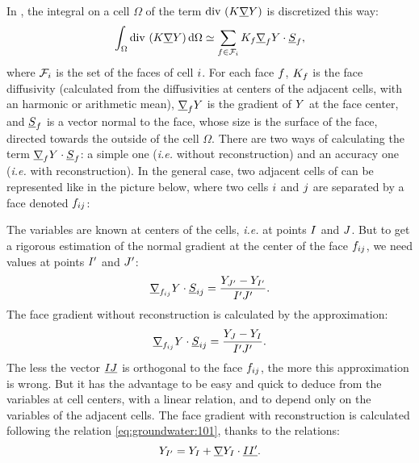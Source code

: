 In \CS, the integral on a cell $\Omega$ of the term $\dive \left( K \grad \varia \right)$ is discretized this way:
\begin{equation}
 \label{eq:groundwater:discrete_diffusive}
\int_{\Omega} \dive \left( K \grad \varia \right) \dd \Omega \simeq \sum_{\face \in \Face{\celli}} K_\face \grad_\face \varia \cdot \vect{S}_\face,
\end{equation}
where $\Face{\celli}$ is the set of the faces of cell $\celli$. For each face $\face$,
$K_\face$ is the face diffusivity (calculated from the diffusivities at centers of
the adjacent cells, with an harmonic or arithmetic mean),
$\grad_\face \varia$ is the gradient of $\varia$ at the face center,
and $\vect{S}_\face$ is a vector normal to the face, whose size is the surface of the face, directed towards the outside of the cell $\Omega$.
There are two ways of calculating the term $\grad_\face Y \cdot \vect{S}_\face$: a simple one (\emph{i.e.} without reconstruction)
and an accuracy one (\emph{i.e.} with reconstruction). In the general case, two adjacent cells of \CS can be represented like in the picture below,
where two cells $\celli$ and $\cellj$ are separated by a face denoted $\fij$:
\begin{figure}[!h]
\end{figure}
The variables are known at centers of the cells, \emph{i.e.} at points $\centi$ and $\centj$. But to get a rigorous estimation of the normal gradient at
the center of the face $\fij$, we need values at points $\centip$ and $\centjp$:
\begin{equation}
 \label{eq:groundwater:101}
\grad_{\fij}\varia \cdot \vect{S}_{\ij} = \frac{\varia_{\centjp}-\varia_{\centip}}{\centip\centjp}.
\end{equation}
The face gradient without reconstruction is calculated by the approximation:
\begin{equation}
 \label{eq:groundwater:102}
\grad_{\fij}\varia \cdot \vect{S}_{\ij} = \frac{\varia_{\centj}-\varia_{\centi}}{\centip\centjp}.
\end{equation}
The less the vector $\vect{\centi\centj}$ is orthogonal to the face $\fij$, the more this approximation is wrong. But it has the advantage to be easy and quick
to deduce from the variables at cell centers, with a linear relation, and to depend only on the variables of the adjacent cells.
The face gradient with reconstruction is calculated following the relation \eqref{eq:groundwater:101}, thanks to the relations:
\begin{equation}
 \label{eq:groundwater:103}
\varia_{\centip} = \varia_{\centi} + \grad \varia_\centi  \cdot \vect{\centi\centip}.
\end{equation}
